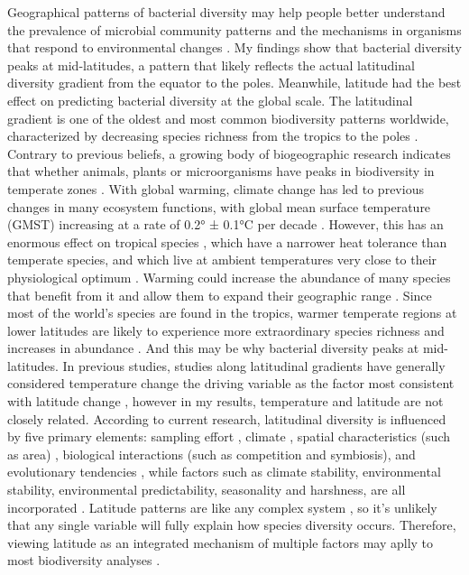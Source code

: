 \documentclass[11pt, a4paper]{article}
\begin{document}
\begin{spacing}{1.5}
Geographical patterns of bacterial diversity may help people better understand the prevalence of microbial community patterns and the mechanisms in organisms that respond to environmental changes \citep{fuhrman2008latitudinal}. My findings show that bacterial diversity peaks at mid-latitudes, a pattern that likely reflects the actual latitudinal diversity gradient from the equator to the poles. Meanwhile, latitude had the best effect on predicting bacterial diversity at the global scale. The latitudinal gradient is one of the oldest and most common biodiversity patterns worldwide, characterized by decreasing species richness from the tropics to the poles \citep{gaston1996biodiversity, gaston2000global, stevens1989latitudinal}. Contrary to previous beliefs, a growing body of biogeographic research indicates that whether animals, plants or microorganisms have peaks in biodiversity in temperate zones \citep{kerswell2006global, ladau2013global, lucifora2011global, phillips2019global, sato2021potential, tittensor2010global}. With global warming, climate change has led to previous changes in many ecosystem functions, with global mean surface temperature (GMST) increasing at a rate of 0.2° ± 0.1°C per decade \citep{change2007climate}. However, this has an enormous effect on tropical species \citep{antao2020temperature, colwell2008global, dillon2010global, pounds1999biological}, which have a narrower heat tolerance than temperate species, and which live at ambient temperatures very close to their physiological optimum \citep{deutsch2008impacts}. Warming could increase the abundance of many species that benefit from it and allow them to expand their geographic range \citep{chen2011rapid, hickling2006distributions, thomas2010climate}. Since most of the world's species are found in the tropics, warmer temperate regions at lower latitudes are likely to experience more extraordinary species richness and increases in abundance \citep{bates2014defining, tittensor2010global}. And this may be why bacterial diversity peaks at mid-latitudes. In previous studies, studies along latitudinal gradients have generally considered temperature change the driving variable as the factor most consistent with latitude change \citep{fierer2011microbes, gaston2000global}, however in my results, temperature and latitude are not closely related. According to current research, latitudinal diversity is influenced by five primary elements: sampling effort \citep{fierer2011microbes}, climate \citep{currie1991energy, hawkins2003energy}, spatial characteristics (such as area) \citep{rosenzweig_1995, terborgh1973notion}, biological interactions (such as competition and symbiosis), and evolutionary tendencies \citep{gaston2000global, willig2003latitudinal}, while factors such as climate stability, environmental stability, environmental predictability, seasonality and harshness, are all incorporated \citep{kaufman1998structure, willig2003latitudinal}. Latitude patterns are like any complex system \citep{10011263723}, so it's unlikely that any single variable will fully explain how species diversity occurs. Therefore, viewing latitude as an integrated mechanism of multiple factors may aplly to most biodiversity analyses \citep{gaston2000global, willig2003latitudinal}. 


\end{spacing}
\end{document}
